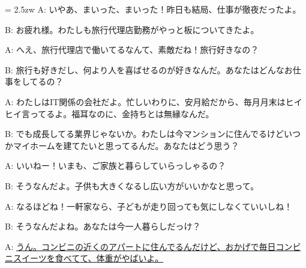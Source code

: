 \documentclass[11pt]{amsart}
\title{}
\author{}
\newenvironment{hangall}[1]{\hangindent = 2.5zw\everypar{\hangindent = 2.5zw}}{}
\begin{document}
\maketitle
\begin{hangall}{}%
A: いやあ、まいった、まいった！昨日も結局、仕事が徹夜だったよ。

B: お疲れ様。わたしも旅行代理店勤務がやっと板についてきたよ。

A: へえ、旅行代理店で働いてるなんて、素敵だね！旅行好きなの？

B: 旅行も好きだし、何より人を喜ばせるのが好きなんだ。あなたはどんなお仕事をしてるの？

A: わたしはIT関係の会社だよ。忙しいわりに、安月給だから、毎月月末はヒイヒイ言ってるよ。福耳なのに、金持ちとは無縁なんだ。

B: でも成長してる業界じゃないか。わたしは今マンションに住んでるけどいつかマイホームを建てたいと思ってるんだ。あなたはどう思う？

A: いいねー！いまも、ご家族と暮らしていらっしゃるの？

B: そうなんだよ。子供も大きくなるし広い方がいいかなと思って。

A: なるほどね！一軒家なら、子どもが走り回っても気にしなくていいしね！

B: そうなんだよね。あなたは今一人暮らしだっけ？

A: \ul{うん。コンビニの近くのアパートに住んでるんだけど、おかげで毎日コンビニスイーツを食べてて、体重がやばいよ。}\end{hangall}
\end{document}
